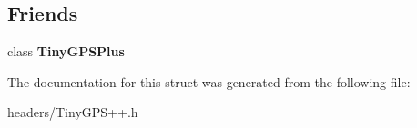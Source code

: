 \subsection*{Friends}
\begin{DoxyCompactItemize}
\item 
class {\bfseries Tiny\+G\+P\+S\+Plus}\hypertarget{struct_tiny_g_p_s_time_a6501fd5ef19ae166d43e0e5781609ee2}{}\label{struct_tiny_g_p_s_time_a6501fd5ef19ae166d43e0e5781609ee2}

\end{DoxyCompactItemize}


The documentation for this struct was generated from the following file\+:\begin{DoxyCompactItemize}
\item 
headers/Tiny\+G\+P\+S++.\+h\end{DoxyCompactItemize}
